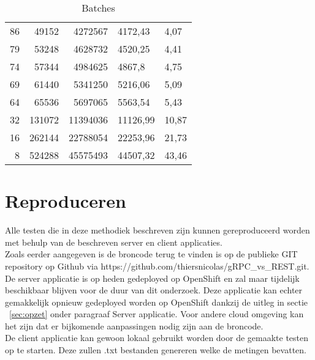 \begin{table}
\begin{tabular}{rrrll}
        86 & 49152 & 4272567 & 4172,43 & 4,07 \\
        79 & 53248 & 4628732 & 4520,25 & 4,41 \\
        74 & 57344 & 4984625 & 4867,8 & 4,75 \\
        69 & 61440 & 5341250 & 5216,06 & 5,09 \\
        64 & 65536 & 5697065 & 5563,54 & 5,43 \\
        32 & 131072 & 11394036 & 11126,99 & 10,87 \\
        16 & 262144 & 22788054 & 22253,96 & 21,73 \\
        8 & 524288 & 45575493 & 44507,32 & 43,46 \\
        \bottomrule
    \end{tabular}
    \caption{Batches}
    \label{tab:Batches}
\end{table}

\section{Reproduceren}
Alle testen die in deze methodiek beschreven zijn kunnen gereproduceerd worden met behulp van de beschreven server en client applicaties.\\
Zoals eerder aangegeven is de broncode terug te vinden is op de publieke GIT repository op Github via https://github.com/thiersnicolas/gRPC\_vs\_REST.git.
De server applicatie is op heden gedeployed op OpenShift en zal maar tijdelijk beschikbaar blijven voor de duur van dit onderzoek.
Deze applicatie kan echter gemakkelijk opnieuw gedeployed worden op OpenShift dankzij de uitleg in sectie ~\ref{sec:opzet} onder paragraaf Server applicatie.
Voor andere cloud omgeving kan het zijn dat er bijkomende aanpassingen nodig zijn aan de broncode.\\
De client applicatie kan gewoon lokaal gebruikt worden door de gemaakte testen op te starten. Deze zullen .txt bestanden genereren welke de metingen bevatten.




